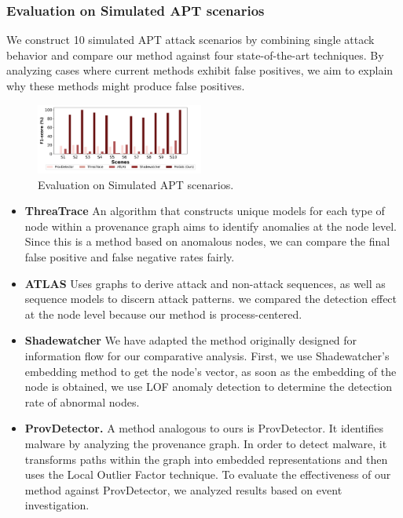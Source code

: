 \subsubsection{Evaluation on Simulated APT scenarios}
We construct 10 simulated APT attack scenarios by combining single attack behavior and compare our method against four state-of-the-art techniques. By analyzing cases where current methods exhibit false positives, we aim to explain why these methods might produce false positives.

\begin{figure}[ht]
    \centering
      \includegraphics[width=0.49\textwidth]{figs/compare.pdf}
    \caption{Evaluation on Simulated APT scenarios.}
    \label{fig-eva-apt}
\end{figure}

\begin{itemize}
    \item \textbf{ThreaTrace}\cite{wang2022threatrace} An algorithm that constructs unique models for each type of node within a provenance graph aims to identify anomalies at the node level. Since this is a method based on anomalous nodes, we can compare the final false positive and false negative rates fairly.
    \item \textbf{ATLAS}\cite{alsaheel2021atlas} Uses graphs to derive attack and non-attack sequences, as well as sequence models to discern attack patterns. we compared the detection effect at the node level because our method is process-centered.
    \item \textbf{Shadewatcher} \cite{zengy2022shadewatcher} We have adapted the method originally designed for information flow for our comparative analysis. First, we use Shadewatcher's embedding method to get the node's vector, as soon as the embedding of the node is obtained, we use LOF anomaly detection to determine the detection rate of abnormal nodes.
    \item \textbf{ProvDetector.} A method analogous to ours is ProvDetector\cite{wang2020you}. It identifies malware by analyzing the provenance graph. In order to detect malware, it transforms paths within the graph into embedded representations and then uses the Local Outlier Factor technique. To evaluate the effectiveness of our method against ProvDetector, we analyzed results based on event investigation.
\end{itemize}


